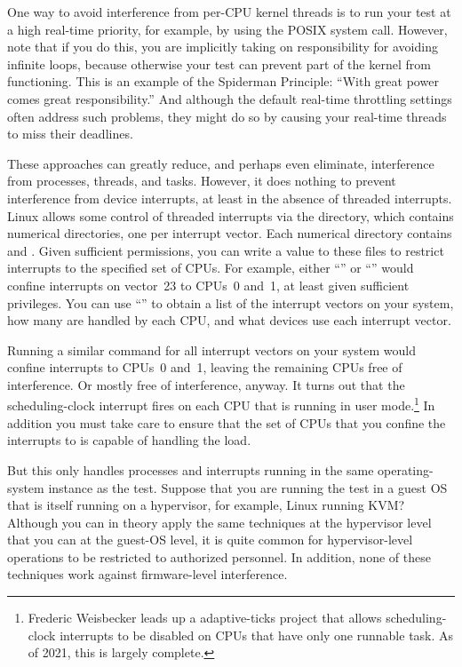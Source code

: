 One way to avoid interference from per-CPU kernel threads is to run
your test at a high real-time priority, for example, by using
the POSIX  system call.
However, note that if you do this, you are implicitly taking on
responsibility for avoiding infinite loops, because otherwise
your test can prevent part of the kernel from functioning.
This is an example of the Spiderman Principle: ``With great
power comes great responsibility.''
And although the default real-time throttling settings often address
such problems, they might do so by causing your real-time threads
to miss their deadlines.

These approaches can greatly reduce, and perhaps even eliminate,
interference from processes, threads, and tasks.
However, it does nothing to prevent interference from device
interrupts, at least in the absence of threaded interrupts.
Linux allows some control of threaded interrupts via the
 directory, which contains numerical directories, one
per interrupt vector.
Each numerical directory contains  and
.
Given sufficient permissions, you can write a value to these files
to restrict interrupts to the specified set of CPUs.
For example, either
``''
or
``''
would confine interrupts on vector~23 to CPUs~0 and~1,
at least given sufficient privileges.
You can use ``'' to obtain a list of the interrupt
vectors on your system, how many are handled by each CPU, and what
devices use each interrupt vector.

Running a similar command for all interrupt vectors on your system
would confine interrupts to CPUs~0 and~1, leaving the remaining CPUs
free of interference.
Or mostly free of interference, anyway.
It turns out that the scheduling-clock interrupt fires on each CPU
that is running in user mode.\footnote{
	Frederic Weisbecker leads up a 
	adaptive-ticks project
	that allows scheduling-clock interrupts to be disabled
	on CPUs that have only one runnable task.
	As of 2021, this is largely complete.}
In addition you must take care to ensure that the set of CPUs that you
confine the interrupts to is capable of handling the load.

But this only handles processes and interrupts running in the same
operating-system instance as the test.
Suppose that you are running the test in a guest OS that is itself
running on a hypervisor, for example, Linux running KVM?
Although you can in theory apply the same techniques at the hypervisor
level that you can at the guest-OS level, it is quite common for
hypervisor-level operations to be restricted to authorized personnel.
In addition, none of these techniques work against firmware-level
interference.

